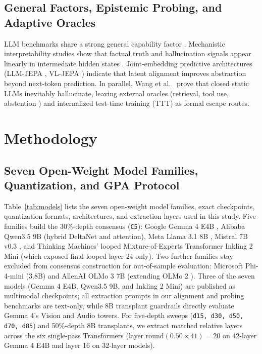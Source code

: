 \documentclass[conference]{IEEEtran}
\begin{document}
\subsection{General Factors, Epistemic Probing, and Adaptive Oracles}
LLM benchmarks share a strong general capability factor \cite{ilic2023evidence}. Mechanistic interpretability studies show that factual truth and hallucination signals appear linearly in intermediate hidden states \cite{burns2022discovering,azaria2023internal,marks2024geometry,orgad2024llms,rimsky2024steering}. Joint-embedding predictive architectures (LLM-JEPA \cite{huang2025llmjepa}, VL-JEPA \cite{chen2025vljepa}) indicate that latent alignment improves abstraction beyond next-token prediction. In parallel, Wang et al.~\cite{xi2025hallucination} prove that closed static LLMs inevitably hallucinate, leaving external oracles (retrieval, tool use, abstention \cite{kadavath2022language,wei2025truthrl}) and internalized test-time training (TTT) \cite{behrouz2024titans,zhang2025lact,tandon2025ttte2e,feng2026inplace} as formal escape routes.

\section{Methodology}
\label{sec:method}
\subsection{Seven Open-Weight Model Families, Quantization, and GPA Protocol}
Table~\ref{tab:models} lists the seven open-weight model families, exact checkpoints, quantization formats, architectures, and extraction layers used in this study. Five families build the 30\%-depth consensus (\texttt{C5}): Google Gemma 4 E4B \cite{gemmateam2026gemma4}, Alibaba Qwen3.5 9B \cite{qwen2026qwen35} (hybrid DeltaNet and attention), Meta Llama 3.1 8B \cite{grattafiori2024llama3}, Mistral 7B v0.3 \cite{jiang2023mistral}, and Thinking Machines' looped Mixture-of-Experts Transformer Inkling 2 Mini \cite{thinkingmachines2026inkling} (which exposed final looped layer 24 only). Two further families stay excluded from consensus construction for out-of-sample evaluation: Microsoft Phi-4-mini (3.8B) \cite{abouelenin2025phi4mini} and AllenAI OLMo 3 7B \cite{olmo2025olmo3} (extending OLMo 2 \cite{walsh2025olmo2}). Three of the seven models (Gemma 4 E4B, Qwen3.5 9B, and Inkling 2 Mini) are published as multimodal checkpoints; all extraction prompts in our alignment and probing benchmarks are text-only, while 8B transplant guardrails directly evaluate Gemma 4's Vision and Audio towers. For five-depth sweeps (\texttt{d15, d30, d50, d70, d85}) and 50\%-depth 8B transplants, we extract matched relative layers across the six single-pass Transformers (layer $\text{round}(0.50 \times 41)=20$ on 42-layer Gemma 4 E4B and layer 16 on 32-layer models).
\end{document}
